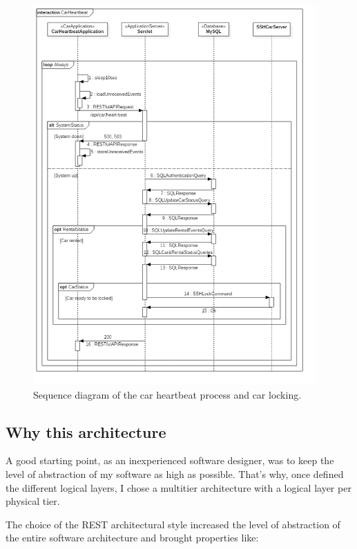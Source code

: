 \begin{figure}[H]
	\noindent
    	\centering
    	\includegraphics[height=550px, keepaspectratio]{diagrams/SequenceCarHeartbeat.png}
	\caption{Sequence diagram of the car heartbeat process and car locking.}
    	\label{fig:sequence-heartbeat}
\end{figure}

\subsection{Why this architecture}

A good starting point, as an inexperienced software designer, was to keep the level of abstraction of my software as high as possible. That's why, once defined the different logical layers, I chose a multitier architecture with a logical layer per physical tier.

The choice of the REST architectural style increased the level of abstraction of the entire software architecture and brought properties like:

